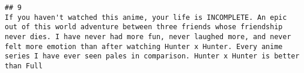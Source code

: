 \documentclass[
]{article}
\begin{document}
\begin{verbatim}
## 9                                                                                                                                                                                                                                                                                                                                                                                                                                                                                                                                                                                                                                                                                                                                                                                                                                                                                                                                                                                                                                                                                                                                                                                                                                                                                                                                                                                                                                                                                                                                                                                                                                                                                                                                                                                                                                                                                                                                                                                                                                                                                                                                                                                                                                                                                                                                                                                                                                                                                                                                                                                                                                                                                                                                                                                                                                                                                                                                                                                                                                                                                 If you haven't watched this anime, your life is INCOMPLETE. An epic out of this world adventure between three friends whose friendship never dies. I have never had more fun, never laughed more, and never felt more emotion than after watching Hunter x Hunter. Every anime series I have ever seen pales in comparison. Hunter x Hunter is better than Full 
\end{verbatim}
\end{document}
